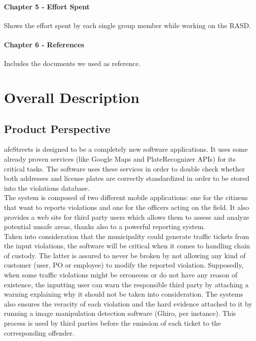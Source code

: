 \documentclass{article}
\begin{document}
\paragraph{Chapter 5 - Effort Spent}
Shows the effort spent by each single group member while working on the RASD.
\paragraph{Chapter 6 - References}
Includes the documents we used as reference.

\newpage
\section{Overall Description}
\subsection{Product Perspective}
afeStreets is designed to be a completely new software applications. It uses
some already proven services (like Google Maps and PlateRecognizer APIs) for its
critical tasks. The software uses these services in order to double check
whether both addresses and license plates are correctly standardized in order to
be stored into the violations database.\\
The system is composed of two different mobile applications: one for the
citizens that want to reports violations and one for the officers acting on the
field. It also provides a web site for third party users which allows them to
assess and analyze potential unsafe areas, thanks also to a powerful reporting
system.\\
Taken into consideration that the municipality could generate traffic tickets
from the input violations, the software will be critical when it comes to
handling chain of custody. The latter is assured to never be broken by not
allowing any kind of customer (user, PO or employee) to modify the reported
violation. Supposedly, when some traffic violations might be erroneous or do not
have any reason of existence, the inputting user can warn the responsible third
party by attaching a warning explaining why it should not be taken into
consideration. The systems also ensures the veracity of each violation and the
hard evidence attached to it by running a image manipulation detection software
(Ghiro, per instance). This process is used by third parties before the emission
of each ticket to the corresponding offender.\\
\\
\end{document}

